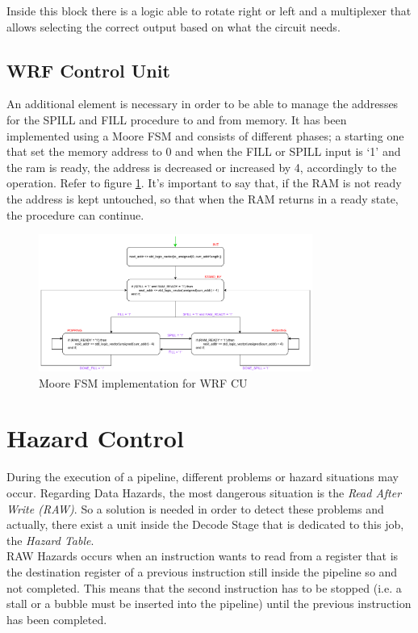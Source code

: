 Inside this block there is a logic able to rotate right or left and a multiplexer that allows selecting the correct output based on what the circuit needs. 

\subsection{WRF Control Unit}

An additional element is necessary in order to be able to manage the addresses for the SPILL and FILL procedure to and from memory. It has been implemented using a Moore FSM and consists of different phases; a starting one that set the memory address to 0 and when the FILL or SPILL input is `1' and the ram is ready, the address is decreased or increased by 4, accordingly to the operation. Refer to figure \ref{wrf_cu}. It's important to say that, if the RAM is not ready the address is kept untouched, so that when the RAM returns in a ready state, the procedure can continue.


\begin{figure}[ht]
	\centering
	\includegraphics[width=0.8\textwidth]{chapters/4_DecodeStage/images/wRF_CU.pdf}
	\caption{Moore FSM implementation for WRF CU}
	\label{wrf_cu}
\end{figure}

\section{Hazard Control}

During the execution of a pipeline, different problems or hazard situations may occur. Regarding Data Hazards, the most dangerous situation is the \emph{Read After Write (RAW)}. So a solution is needed in order to detect these problems and actually, there exist a unit inside the Decode Stage that is dedicated to this job, the \emph{Hazard Table}.\\

RAW Hazards occurs when an instruction wants to read from a register that is the destination register of a previous instruction still inside the pipeline so and not completed. This means that the second instruction has to be stopped (i.e. a stall or a bubble must be inserted into the pipeline) until the previous instruction has been completed.\\

